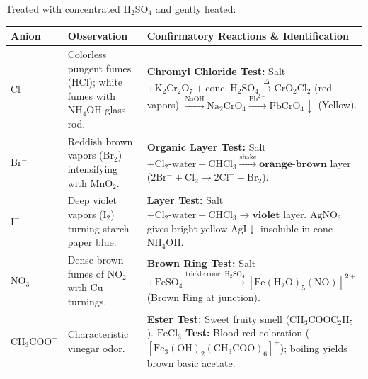 \documentclass[10pt,twoside,openright]{book}
\begin{document}
\begin{conceptbox}
Treated with concentrated $\mathrm{H_2SO_4}$ and gently heated:
\begin{center}
\scriptsize
\setlength{\tabcolsep}{2.5pt}
\renewcommand{\arraystretch}{1.15}
\begin{tabularx}{\linewidth}{|l|p{2.6cm}|X|}
\hline
\textbf{Anion} & \textbf{Observation} & \textbf{Confirmatory Reactions \& Identification} \\
\hline
$\mathrm{Cl^-}$ & Colorless pungent fumes ($\mathrm{HCl}$); white fumes with $\mathrm{NH_4OH}$ glass rod. & \textbf{Chromyl Chloride Test:} Salt $+ \mathrm{K_2Cr_2O_7} + \mathrm{conc.\; H_2SO_4} \xrightarrow{\Delta} \mathrm{CrO_2Cl_2}$ (red vapors) $\xrightarrow{\mathrm{NaOH}} \mathrm{Na_2CrO_4} \xrightarrow{\mathrm{Pb^{2+}}} \mathbf{\mathrm{PbCrO_4} \downarrow}$ (Yellow). \\
\hline
$\mathrm{Br^-}$ & Reddish brown vapors ($\mathrm{Br_2}$) intensifying with $\mathrm{MnO_2}$. & \textbf{Organic Layer Test:} Salt $+ \mathrm{Cl_2\text{-water}} + \mathrm{CHCl_3} \xrightarrow{\text{shake}} \mathbf{\text{orange-brown}}$ layer ($2\mathrm{Br^-} + \mathrm{Cl_2} \to 2\mathrm{Cl^-} + \mathrm{Br_2}$). \\
\hline
$\mathrm{I^-}$ & Deep violet vapors ($\mathrm{I_2}$) turning starch paper blue. & \textbf{Layer Test:} Salt $+ \mathrm{Cl_2\text{-water}} + \mathrm{CHCl_3} \to \mathbf{\text{violet}}$ layer. $\mathrm{AgNO_3}$ gives bright yellow $\mathrm{AgI} \downarrow$ insoluble in conc $\mathrm{NH_4OH}$. \\
\hline
$\mathrm{NO_3^-}$ & Dense brown fumes of $\mathrm{NO_2}$ with $\mathrm{Cu}$ turnings. & \textbf{Brown Ring Test:} Salt $+ \mathrm{FeSO_4} \xrightarrow{\text{trickle conc. } \mathrm{H_2SO_4}} \mathbf{[\mathrm{Fe(H_2O)_5(NO)}]^{2+}}$ (Brown Ring at junction). \\
\hline
$\mathrm{CH_3COO^-}$ & Characteristic vinegar odor. & \textbf{Ester Test:} Sweet fruity smell ($\mathrm{CH_3COOC_2H_5}$). \textbf{$\mathrm{FeCl}_3$ Test:} Blood-red coloration ($\mathrm{[Fe_3(OH)_2(CH_3COO)_6]^+}$); boiling yields brown basic acetate. \\
\hline
\end{tabularx}
\end{center}
\end{conceptbox}
\end{document}
